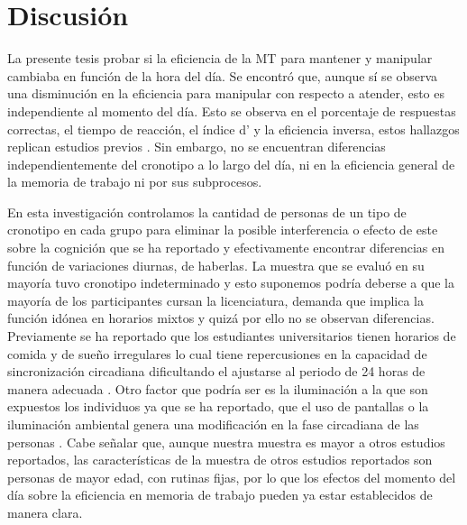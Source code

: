 \documentclass[12pt,letterpaper,final]{article}
\let\cite\cite %
\begin{document}
\section{Discusión}
La presente tesis probar si la eficiencia de la MT para mantener y manipular cambiaba en función de la hora del día. Se encontró que, aunque sí se observa una disminución en la eficiencia para manipular con respecto a atender, esto es independiente al momento del día. Esto se observa en el porcentaje de respuestas correctas, el tiempo de reacción, el índice d’ y la eficiencia inversa, estos hallazgos replican estudios previos  \cite{DEsposito2015, Veltman2003}. Sin embargo, no se encuentran diferencias independientemente del cronotipo a lo largo del día, ni en la eficiencia general de la memoria de trabajo ni por sus subprocesos. 

En esta investigación controlamos la cantidad de personas de un tipo de cronotipo en cada grupo para eliminar la posible interferencia o efecto de este sobre la cognición que se ha reportado y efectivamente encontrar diferencias en función de variaciones diurnas, de haberlas. La muestra que se evaluó en su mayoría tuvo cronotipo indeterminado y esto suponemos podría deberse a que la mayoría de los participantes cursan la licenciatura, demanda que implica la función idónea en horarios mixtos y quizá por ello no se observan diferencias. Previamente se ha reportado que los estudiantes universitarios tienen horarios de comida y de sueño irregulares \cite{Lund2010} lo cual tiene repercusiones en la capacidad de sincronización circadiana  dificultando el ajustarse  al periodo de 24 horas de manera adecuada \cite{Harma1993}. Otro factor que podría ser es la iluminación a la que son expuestos los individuos ya que se ha reportado, que el uso de pantallas o la iluminación ambiental genera una modificación en la fase circadiana de las personas \cite{Chang2015,Chang2011,Gronfier2007}.
Cabe señalar que, aunque nuestra muestra es mayor a otros estudios reportados, las características de la muestra de otros estudios reportados son personas de mayor edad, con rutinas fijas, por lo que los efectos del momento del día sobre la eficiencia en memoria de trabajo pueden ya estar establecidos de manera clara.
\end{document}
